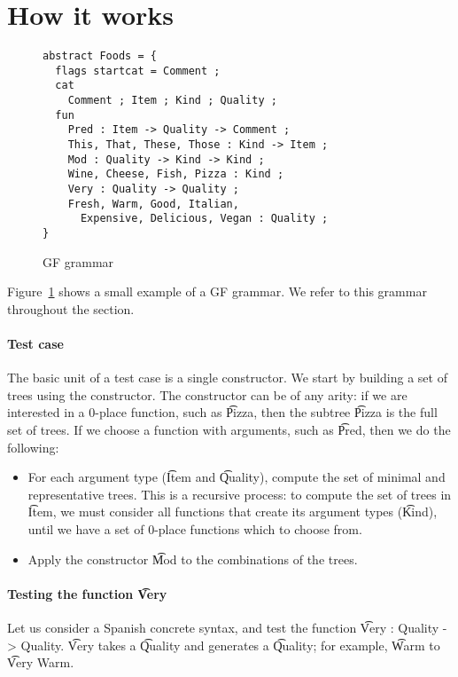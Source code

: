 \section{How it works}


\begin{figure}[h]

  \centering
    \begin{verbatim}
abstract Foods = {
  flags startcat = Comment ;
  cat
    Comment ; Item ; Kind ; Quality ;
  fun
    Pred : Item -> Quality -> Comment ;
    This, That, These, Those : Kind -> Item ;
    Mod : Quality -> Kind -> Kind ;
    Wine, Cheese, Fish, Pizza : Kind ;
    Very : Quality -> Quality ;
    Fresh, Warm, Good, Italian, 
      Expensive, Delicious, Vegan : Quality ;
}
    \end{verbatim}
  \caption{GF grammar}
\label{fig:exampleGrammar}
\end{figure}

Figure~\ref{fig:exampleGrammar} shows a small example of a GF
grammar. We refer to this grammar throughout the section. 

\paragraph{Test case} 
The basic unit of a test case is a single constructor. 
We start by building a set of trees using the constructor.
The constructor can be of any arity: if we are interested in a 0-place
function, such as \t{Pizza}, then the subtree \t{Pizza} is the full
set of trees. If we choose a function with arguments, such as
\t{Pred}, then we do the following: 
\begin{itemize}
\item For each argument type (\t{Item} and \t{Quality}), compute the
  set of minimal and representative trees. This is a recursive
  process: to compute the set of trees in \t{Item}, we must consider
  all functions that create its argument types (\t{Kind}), until we
  have a set of 0-place functions which to choose from. 
\item Apply the constructor \t{Mod} to the combinations of the trees.
\end{itemize}

\paragraph{Testing the function \t{Very}}
Let us consider a Spanish concrete syntax, and test the function
\t{Very : Quality -> Quality}. \t{Very} takes a \t{Quality} and
generates a \t{Quality}; for example, \t{Warm} to \t{Very Warm}. 

